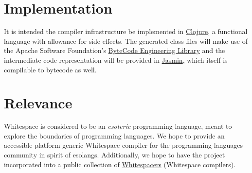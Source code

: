 \documentclass[10pt,letter]{article}
\begin{document}
	\section{Implementation}
		It is intended the compiler infrastructure be implemented in \href{https://clojure.org/index}{Clojure}, a functional language with allowance for side effects. The generated class files will make use of the Apache Software Foundation's \href{https://commons.apache.org/proper/commons-bcel/index.html}{ByteCode Engineering Library} and the intermediate code representation will be provided in \href{http://jasmin.sourceforge.net/}{Jasmin}, which itself is compilable to bytecode as well.
	\section{Relevance}
		Whitespace is considered to be an \textit{esoteric} programming language, meant to explore the boundaries of programming languages. We hope to provide an accessible platform generic Whitespace compiler for the programming languages community in spirit of esolangs. Additionally, we hope to have the project incorporated into a public collection of \href{https://github.com/hostilefork/whitespacers/}{Whitespacers} (Whitespace compilers).
\end{document}
